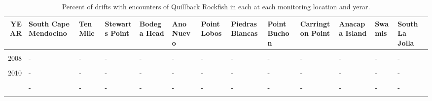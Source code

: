 \documentclass[
]{article}
\begin{document}
\begin{landscape}\begin{table}

\caption{\label{tab:unnamed-chunk-3}Percent of drifts with encounters of Quillback Rockfish in each at each monitoring location and yerar.}
\centering
\begin{tabular}[t]{r>{\raggedright\arraybackslash}p{1.7cm}>{\raggedright\arraybackslash}p{1.2cm}>{\raggedright\arraybackslash}p{1.2cm}>{\raggedright\arraybackslash}p{1.2cm}>{\raggedright\arraybackslash}p{1.2cm}>{\raggedright\arraybackslash}p{1.2cm}>{\raggedright\arraybackslash}p{1.2cm}>{\raggedright\arraybackslash}p{1.2cm}>{\raggedright\arraybackslash}p{1.2cm}>{\raggedright\arraybackslash}p{1.2cm}>{\raggedright\arraybackslash}p{1.2cm}l}
\toprule
YEAR & South Cape Mendocino & Ten Mile & Stewarts Point & Bodega Head & Ano Nuevo & Point Lobos & Piedras Blancas & Point Buchon & Carrington Point & Anacapa Island & Swamis & South La Jolla\\
\midrule
\cellcolor{gray!6}{2007} & \cellcolor{gray!6}{-} & \cellcolor{gray!6}{-} & \cellcolor{gray!6}{-} & \cellcolor{gray!6}{-} & \cellcolor{gray!6}{-} & \cellcolor{gray!6}{-} & \cellcolor{gray!6}{-} & \cellcolor{gray!6}{-} & \cellcolor{gray!6}{-} & \cellcolor{gray!6}{-} & \cellcolor{gray!6}{-} & \cellcolor{gray!6}{-}\\
2008 & - & - & - & - & - & - & - & - & - & - & - & -\\
\cellcolor{gray!6}{2009} & \cellcolor{gray!6}{-} & \cellcolor{gray!6}{-} & \cellcolor{gray!6}{-} & \cellcolor{gray!6}{-} & \cellcolor{gray!6}{-} & \cellcolor{gray!6}{-} & \cellcolor{gray!6}{-} & \cellcolor{gray!6}{-} & \cellcolor{gray!6}{-} & \cellcolor{gray!6}{-} & \cellcolor{gray!6}{-} & \cellcolor{gray!6}{-}\\
2010 & - & - & - & - & - & - & - & - & - & - & - & -\\
\cellcolor{gray!6}{2011} & \cellcolor{gray!6}{-} & \cellcolor{gray!6}{-} & \cellcolor{gray!6}{-} & \cellcolor{gray!6}{-} & \cellcolor{gray!6}{-} & \cellcolor{gray!6}{-} & \cellcolor{gray!6}{-} & \cellcolor{gray!6}{-} & \cellcolor{gray!6}{-} & \cellcolor{gray!6}{-} & \cellcolor{gray!6}{-} & \cellcolor{gray!6}{-}\\
\addlinespace
2012 & - & - & - & - & - & - & - & - & - & - & - & -\\
\cellcolor{gray!6}{2013} & \cellcolor{gray!6}{-} & \cellcolor{gray!6}{-} & \cellcolor{gray!6}{-} & \cellcolor{gray!6}{-} & \cellcolor{gray!6}{-} & \cellcolor{gray!6}{-} & \cellcolor{gray!6}{-} & \cellcolor{gray!6}{-} & \cellcolor{gray!6}{-} & \cellcolor{gray!6}{-} & \cellcolor{gray!6}{-} & \cellcolor{gray!6}{-}\\

\end{tabular}
\end{table}
\end{landscape}
\end{document}
